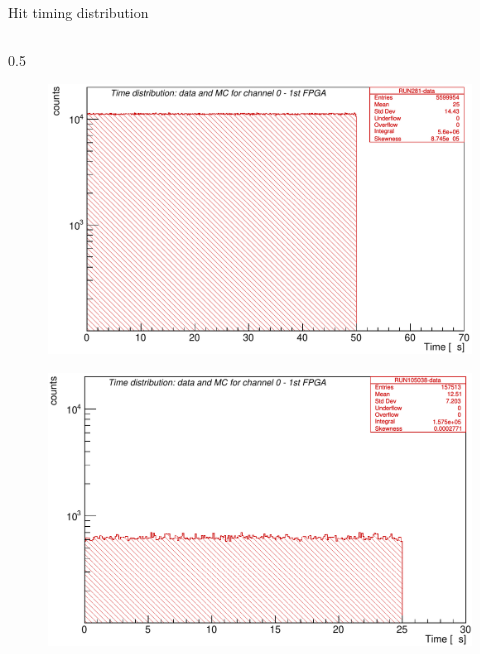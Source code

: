 \documentclass{beamer}
\begin{document}
    \begin{frame}{Hit timing distribution}
        \vspace{-3mm}
        \begin{columns}
            \begin{column}{0.5\framewidth}
                \begin{figure}[H]
                  \centering
                  \hspace*{-2em}
                \includegraphics[width=0.85\columnwidth]{figures/png/Screenshot_20241013_115510.png}
                  \label{fig:enter-label} 
                  \end{figure}
                  \vspace{-4mm}
                  \begin{figure}[H]
                    \centering
                    \hspace*{-2em}
                  \includegraphics[width=0.85\columnwidth]{figures/png/Screenshot_20241013_115638.png}
                    \label{fig:enter-label} 
                    \end{figure}
            \end{column}

\end{columns}
\end{frame}
\end{document}
